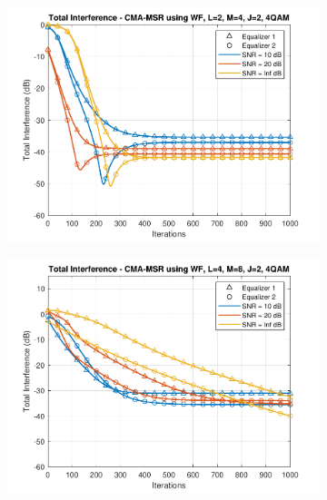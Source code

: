 \begin{figure}
	\centering
	\begin{subfigure}[b]{0.45\textwidth}
		\includegraphics[width=\linewidth]{./figs/BF_WF_MSR_TI_4QAM_L=2_M=4_J=2_K=1000.pdf}
		\label{fig:wf_msr_ti4_24}
	\end{subfigure}
	\begin{subfigure}[b]{0.45\textwidth}
		\includegraphics[width=\linewidth]{./figs/BF_WF_MSR_TI_4QAM_L=4_M=8_J=2_K=1000.pdf}
		\label{fig:wf_msr_ti4_48}
	\end{subfigure}\\
	\begin{subfigure}[b]{0.45\textwidth}

\end{subfigure}
\end{figure}
